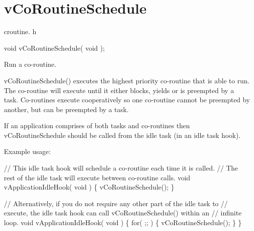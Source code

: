 \hypertarget{group__v_co_routine_schedule}{}\section{v\+Co\+Routine\+Schedule}
\label{group__v_co_routine_schedule}
croutine. h 
\begin{DoxyPre}
void vCoRoutineSchedule( void );\end{DoxyPre}


Run a co-\/routine.

v\+Co\+Routine\+Schedule() executes the highest priority co-\/routine that is able to run. The co-\/routine will execute until it either blocks, yields or is preempted by a task. Co-\/routines execute cooperatively so one co-\/routine cannot be preempted by another, but can be preempted by a task.

If an application comprises of both tasks and co-\/routines then v\+Co\+Routine\+Schedule should be called from the idle task (in an idle task hook).

Example usage\+: 
\begin{DoxyPre}
// This idle task hook will schedule a co-routine each time it is called.
// The rest of the idle task will execute between co-routine calls.
void vApplicationIdleHook( void )
\{
   vCoRoutineSchedule();
\}\end{DoxyPre}



\begin{DoxyPre}// Alternatively, if you do not require any other part of the idle task to
// execute, the idle task hook can call vCoRoutineSchedule() within an
// infinite loop.
void vApplicationIdleHook( void )
\{
   for( ;; )
   \{
       vCoRoutineSchedule();
   \}
\}
\end{DoxyPre}
 